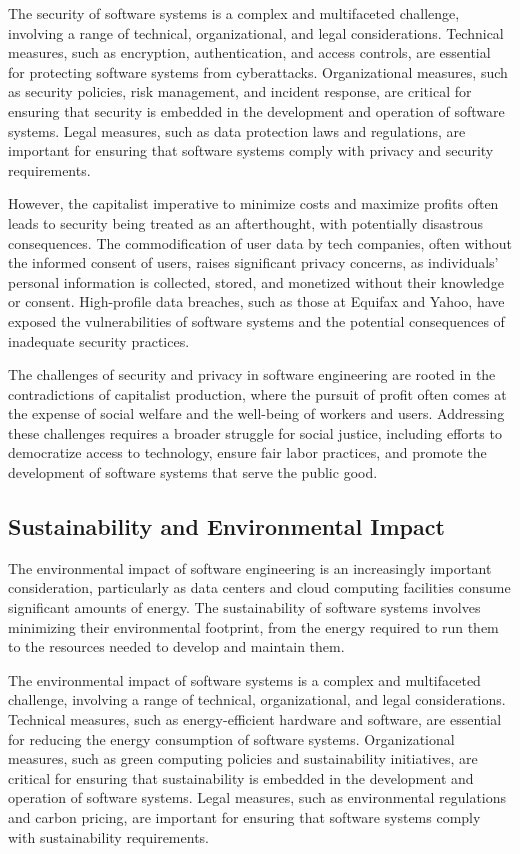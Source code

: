 \begin{refsection}
\begin{multicols}{2}
{The security of software systems is a complex and multifaceted challenge, involving a range of technical, organizational, and legal considerations. Technical measures, such as encryption, authentication, and access controls, are essential for protecting software systems from cyberattacks. Organizational measures, such as security policies, risk management, and incident response, are critical for ensuring that security is embedded in the development and operation of software systems. Legal measures, such as data protection laws and regulations, are important for ensuring that software systems comply with privacy and security requirements.

However, the capitalist imperative to minimize costs and maximize profits often leads to security being treated as an afterthought, with potentially disastrous consequences. The commodification of user data by tech companies, often without the informed consent of users, raises significant privacy concerns, as individuals' personal information is collected, stored, and monetized without their knowledge or consent. High-profile data breaches, such as those at Equifax and Yahoo, have exposed the vulnerabilities of software systems and the potential consequences of inadequate security practices.

The challenges of security and privacy in software engineering are rooted in the contradictions of capitalist production, where the pursuit of profit often comes at the expense of social welfare and the well-being of workers and users. Addressing these challenges requires a broader struggle for social justice, including efforts to democratize access to technology, ensure fair labor practices, and promote the development of software systems that serve the public good.

\subsection{Sustainability and Environmental Impact}

The environmental impact of software engineering is an increasingly important consideration, particularly as data centers and cloud computing facilities consume significant amounts of energy. The sustainability of software systems involves minimizing their environmental footprint, from the energy required to run them to the resources needed to develop and maintain them.

The environmental impact of software systems is a complex and multifaceted challenge, involving a range of technical, organizational, and legal considerations. Technical measures, such as energy-efficient hardware and software, are essential for reducing the energy consumption of software systems. Organizational measures, such as green computing policies and sustainability initiatives, are critical for ensuring that sustainability is embedded in the development and operation of software systems. Legal measures, such as environmental regulations and carbon pricing, are important for ensuring that software systems comply with sustainability requirements.

}
\end{multicols}
\end{refsection}

